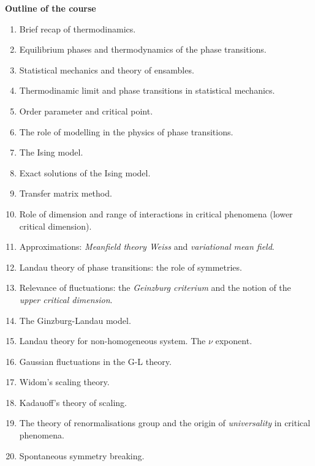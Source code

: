 \documentclass[11pt, a4paper, twoside, openright]{book}
\begin{document}
\clearpage
\LARGE{ \textbf{Outline of the course} }

\normalsize
\begin{enumerate}
\item Brief recap of thermodinamics.
\item Equilibrium phases and thermodynamics of the phase transitions.
\item Statistical mechanics and theory of ensambles.
\item Thermodinamic limit and phase transitions in statistical mechanics.
\item Order parameter and critical point.
\item The role of modelling in the physics of phase transitions.
\item The Ising model.
\item Exact solutions of the Ising model.
\item Transfer matrix method.
\item Role of dimension and range of interactions in critical phenomena (lower critical dimension).
\item Approximations: \emph{Meanfield theory Weiss} and \emph{variational mean field}.
\item Landau theory of phase transitions: the role of symmetries.
\item Relevance of fluctuations: the \emph{Geinzburg criterium} and the notion of the \emph{upper critical dimension}.
\item The Ginzburg-Landau model.
\item Landau theory for non-homogeneous system. The \( \nu  \) exponent.
\item Gaussian fluctuations in the G-L theory.
\item Widom's scaling theory.
\item Kadauoff's theory of scaling.
\item The theory of renormalisations group and the origin of \emph{universality} in critical phenomena.
\item Spontaneous symmetry breaking.

\end{enumerate}






\mainmatter
\pagestyle{fancy}







\end{document}
